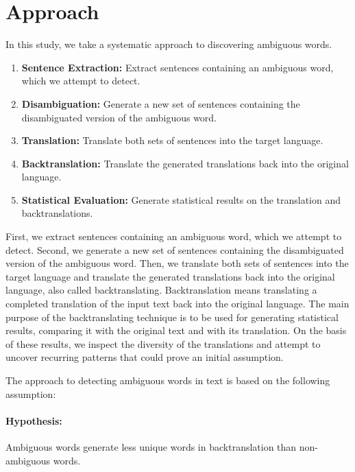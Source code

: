 \section{Approach}
\label{sec:Methodology:Approach}


In this study, we take a systematic approach to discovering ambiguous words. 

\begin{enumerate}
  \item \textbf{Sentence Extraction:} Extract sentences containing an ambiguous word, which we attempt to detect.
  \item \textbf{Disambiguation:} Generate a new set of sentences containing the disambiguated version of the ambiguous word.
  \item \textbf{Translation:} Translate both sets of sentences into the target language.
  \item \textbf{Backtranslation:} Translate the generated translations back into the original language.
  \item \textbf{Statistical Evaluation:} Generate statistical results on the translation and backtranslations.
\end{enumerate}

First, we extract sentences containing an ambiguous word, which we attempt to detect. Second, we generate a new set of sentences containing the disambiguated version of the ambiguous word. Then, we translate both sets of sentences into the target language and translate the generated translations back into the original language, also called backtranslating.
Backtranslation means translating a completed translation of the input text back into the original language. The main purpose of the backtranslating technique is to be used for generating statistical results, comparing it with the original text and with its translation. On the basis of these results, we inspect the diversity of the translations and attempt to uncover recurring patterns that could prove an initial assumption.

The approach to detecting ambiguous words in text is based on the following assumption:

\paragraph{Hypothesis:} Ambiguous words generate less unique words in backtranslation than non-ambiguous words.

